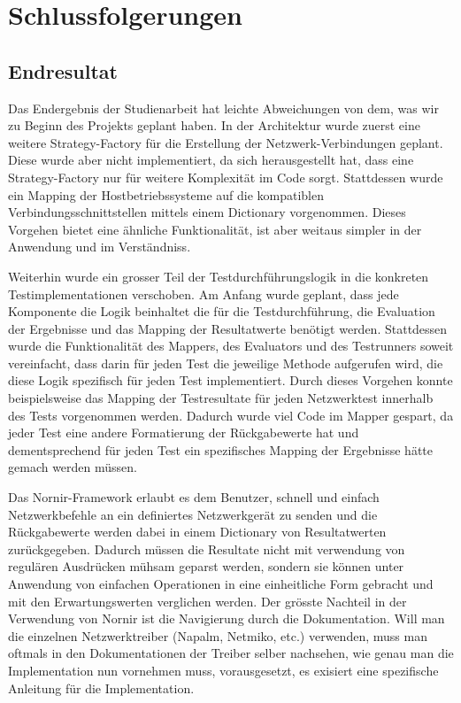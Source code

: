 \documentclass[]{subfiles}
\begin{document}
\section{Schlussfolgerungen}
\subsection{Endresultat}
Das Endergebnis der Studienarbeit hat leichte Abweichungen von dem, was wir zu Beginn
des Projekts geplant haben. 
In der Architektur wurde zuerst eine weitere Strategy-Factory für die Erstellung 
der Netzwerk-Verbindungen geplant. Diese wurde aber nicht implementiert, da 
sich herausgestellt hat, dass eine Strategy-Factory nur für weitere Komplexität 
im Code sorgt. 
Stattdessen wurde ein Mapping der Hostbetriebssysteme auf die 
kompatiblen Verbindungsschnittstellen mittels einem Dictionary vorgenommen.
Dieses Vorgehen bietet eine ähnliche Funktionalität, ist aber weitaus simpler 
in der Anwendung und im Verständniss.

Weiterhin wurde ein grosser Teil der Testdurchführungslogik in die konkreten Testimplementationen
verschoben. 
Am Anfang wurde geplant, dass jede Komponente die Logik beinhaltet die für die Testdurchführung,
die Evaluation der Ergebnisse und das Mapping der Resultatwerte benötigt werden.
Stattdessen wurde die Funktionalität des Mappers, des Evaluators und des Testrunners soweit 
vereinfacht, dass darin für jeden Test die jeweilige Methode aufgerufen wird, die diese
Logik spezifisch für jeden Test implementiert.
Durch dieses Vorgehen konnte beispielsweise das Mapping der Testresultate für jeden 
Netzwerktest innerhalb des Tests vorgenommen werden. 
Dadurch wurde viel Code im Mapper gespart, da jeder Test eine andere Formatierung der 
Rückgabewerte hat und dementsprechend für jeden Test ein spezifisches Mapping der Ergebnisse
hätte gemach werden müssen.

Das Nornir-Framework erlaubt es dem Benutzer, schnell und einfach Netzwerkbefehle an ein
definiertes Netzwerkgerät zu senden und die Rückgabewerte werden dabei in einem 
Dictionary von Resultatwerten zurückgegeben. 
Dadurch müssen die Resultate nicht mit verwendung von regulären Ausdrücken mühsam 
geparst werden, sondern sie können unter Anwendung von einfachen Operationen 
in eine einheitliche Form gebracht und mit den Erwartungswerten verglichen werden.
Der grösste Nachteil in der Verwendung von Nornir ist die Navigierung durch die Dokumentation.
Will man die einzelnen Netzwerktreiber (Napalm, Netmiko, etc.) verwenden, muss man 
oftmals in den Dokumentationen der Treiber selber nachsehen, wie genau man die
Implementation nun vornehmen muss, vorausgesetzt, es exisiert eine spezifische Anleitung
für die Implementation. 
\end{document}
